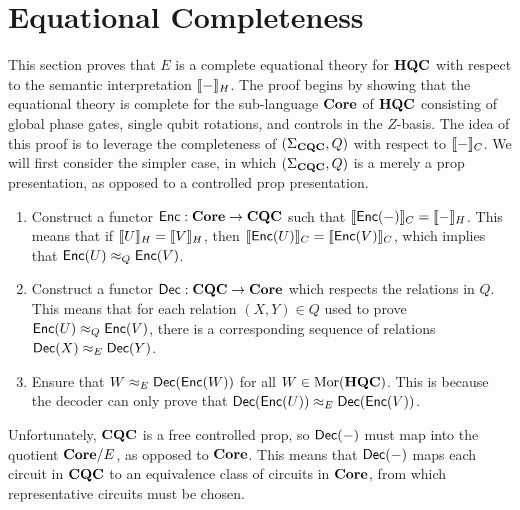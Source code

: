 \section{Equational Completeness}
%
\label{Sect:Completeness}

This section proves that $E$ is a complete equational theory for $\mathbf{HQC}$ with respect to the semantic interpretation $\llbracket-\rrbracket_H$.
The proof begins by showing that the equational theory is complete for the sub-language $\mathbf{Core}$ of $\mathbf{HQC}$ consisting of global phase gates, single qubit rotations, and controls in the $Z$-basis.
The idea of this proof is to leverage the completeness of $( \Sigma_{\mathbf{CQC}}, Q )$ with respect to $\llbracket-\rrbracket_C$.
We will first consider the simpler case, in which $( \Sigma_{\mathbf{CQC}}, Q )$ is a merely a prop presentation, as opposed to a controlled prop presentation.
\begin{enumerate}
\item Construct a functor $\mathsf{Enc}: \mathbf{Core} \to \mathbf{CQC}$ such that $\llbracket\mathsf{Enc}( - )\rrbracket_C = \llbracket-\rrbracket_H$.
      This means that if $\llbracket U\rrbracket_H = \llbracket V\rrbracket_H$, then $\llbracket\mathsf{Enc}(U)\rrbracket_C = \llbracket\mathsf{Enc}(V)\rrbracket_C$, which implies that $\mathsf{Enc}( U ) \approx_Q \mathsf{Enc}( V )$.
\item Construct a functor $\mathsf{Dec}: \mathbf{CQC} \to \mathbf{Core}$ which respects the relations in $Q$.
      This means that for each relation $( X, Y ) \in Q$ used to prove $\mathsf{Enc}( U ) \approx_Q \mathsf{Enc}( V )$, there is a corresponding sequence of relations $\mathsf{Dec}( X ) \approx_E \mathsf{Dec}( Y )$.
\item Ensure that $W \approx_E \mathsf{Dec}( \mathsf{Enc}( W ) )$ for all $W \in \operatorname{Mor}( \mathbf{HQC} )$.
      This is because the decoder can only prove that $\mathsf{Dec}( \mathsf{Enc}( U ) ) \approx_E \mathsf{Dec}( \mathsf{Enc}( V ) )$. 
\end{enumerate}
Unfortunately, $\mathbf{CQC}$ is a free controlled prop, so $\mathsf{Dec}( - )$ must map into the quotient $\mathbf{Core} / E$, as opposed to $\mathbf{Core}$.
This means that $\mathsf{Dec}( - )$ maps each circuit in $\mathbf{CQC}$ to an equivalence class of circuits in $\mathbf{Core}$, from which representative circuits must be chosen.

